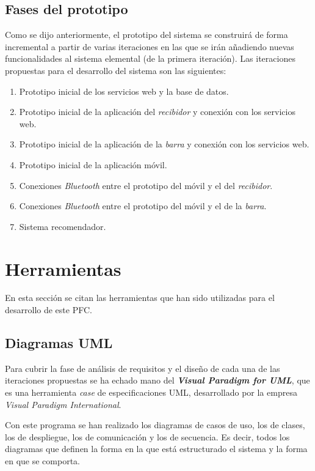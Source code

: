   \subsection{Fases del prototipo}
Como se dijo anteriormente, el prototipo del sistema se construirá de forma
incremental a partir de varias iteraciones en las que se irán añadiendo
nuevas funcionalidades al sistema elemental (de la primera iteración). Las
iteraciones propuestas para el desarrollo del sistema son las siguientes:
\begin{enumerate}
\item Prototipo inicial de los servicios web y la base de datos.
\item Prototipo inicial de la aplicación del \emph{recibidor} y conexión con 
los servicios web.
\item Prototipo inicial de la aplicación de la \emph{barra} y conexión con los 
servicios web.
\item Prototipo inicial de la aplicación móvil.
\item Conexiones \emph{Bluetooth} entre el prototipo del móvil y el del
\emph{recibidor}.
\item Conexiones \emph{Bluetooth} entre el prototipo del móvil y el de la
\emph{barra}.
\item Sistema recomendador.
\end{enumerate}

\section{Herramientas}
En esta sección se citan las herramientas que han sido utilizadas para el 
desarrollo de este \acs{PFC}.

  \subsection{Diagramas \acs{UML}}
  Para cubrir la fase de análisis de requisitos y el diseño de cada una de las
  iteraciones propuestas se ha echado mano del \emph{\textbf{Visual Paradigm
  for \acs{UML}}}, que es una herramienta \emph{case} de especificaciones
  \acs{UML}, desarrollado por la empresa \emph{Visual Paradigm International}.

  Con este programa se han realizado los diagramas de casos de uso, los de
  clases, los de despliegue, los de comunicación y los de secuencia. Es decir,
  todos los diagramas que definen la forma en la que está estructurado el
  sistema y la forma en que se comporta.

